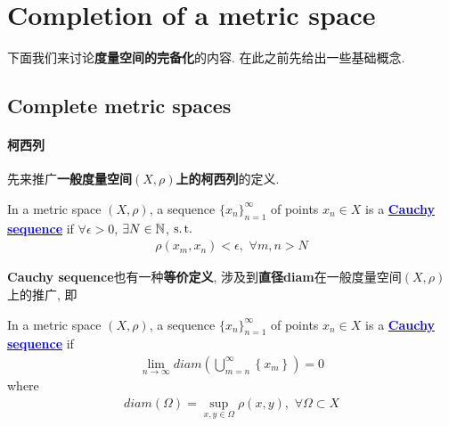  \newpage
 
 \section{Completion of a metric space}
 \begin{center}
 	下面我们来讨论\textbf{度量空间的完备化}的内容. 在此之前先给出一些基础概念.
 \end{center}

\subsection{Complete metric spaces}
\paragraph{柯西列}
	先来推广\textbf{一般度量空间$(X , \rho)$上的柯西列}的定义.
	\begin{defn}\label{def 1.2.1}
		In a metric space $(X , \rho)$, a sequence $\{x_n\}_{n = 1}^{\infty}$ of points $x_n \in X$ is a \underline{\textcolor{blue}{\textbf{Cauchy sequence}}} if $\forall \epsilon > 0$, $\exists N \in \mathbb{N}$, $\operatorname{s.t.}$
		\begin{align}
			\rho(x_m , x_n) < \epsilon , \,\, \forall m , n > N
		\end{align}
		
		\vspace{2em}
		\begin{rmk}
			\textbf{Cauchy sequence}也有一种\textbf{等价定义}, 涉及到\textbf{直径diam}在一般度量空间$(X , \rho)$ 上的推广, 即
			\begin{defn}\label{def 1.2.2}
				In a metric space $(X , \rho)$, a sequence $\{x_n\}_{n = 1}^{\infty}$ of points $x_n \in X$ is a \underline{\textcolor{blue}{\textbf{Cauchy sequence}}} if
				\begin{align}
					\lim_{n \to \infty}{diam(\bigcup_{m = n}^{\infty}{\left\{ x_m \right\}})} = 0
				\end{align}
				where 
				\begin{align}
					diam(\Omega) = \sup_{x , y \in \Omega}{\rho(x , y)} , \,\, \forall \Omega \subset X
				\end{align}
			\end{defn}
		\end{rmk}
	\end{defn}
	
\newpage

